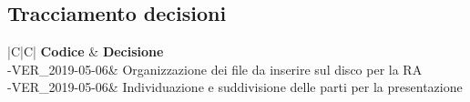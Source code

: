\documentclass[a4paper,12pt]{article}
\begin{document}
	\newpage
	\subsection{Tracciamento decisioni}
	\begin{table}[tbph]
		\centering
		\begin{tabularx}{\textwidth}{|C|C|}
			\hline
			\textbf{Codice } & \textbf{Decisione} \\
			-VER\_2019-05-06& Organizzazione dei file da inserire sul disco per la RA\\
			-VER\_2019-05-06& Individuazione e suddivisione delle parti per la presentazione\\
			\hline
		\end{tabularx}
		\caption{Tracciamento decisioni}
	\end{table}
	\label{LastPage}
\end{document}
